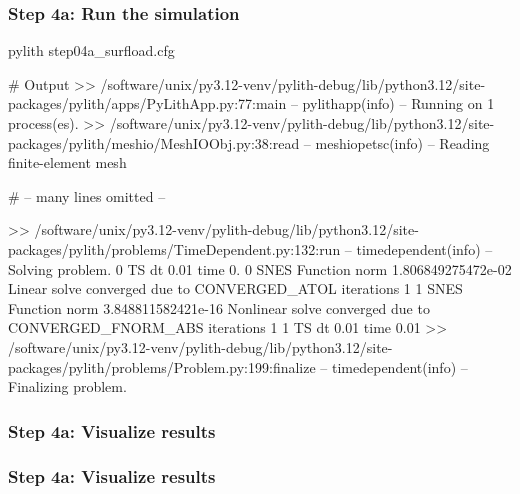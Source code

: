 \documentclass[aspectratio=169]{beamer}
\begin{document}
\begin{frame}[fragile]
  \frametitle{Step 4a: Run the simulation}
  \summary{}

\begin{bashcode}
pylith step04a_surfload.cfg

# Output
 >> /software/unix/py3.12-venv/pylith-debug/lib/python3.12/site-packages/pylith/apps/PyLithApp.py:77:main
 -- pylithapp(info)
 -- Running on 1 process(es).
 >> /software/unix/py3.12-venv/pylith-debug/lib/python3.12/site-packages/pylith/meshio/MeshIOObj.py:38:read
 -- meshiopetsc(info)
 -- Reading finite-element mesh

# -- many lines omitted --

 >> /software/unix/py3.12-venv/pylith-debug/lib/python3.12/site-packages/pylith/problems/TimeDependent.py:132:run
 -- timedependent(info)
 -- Solving problem.
0 TS dt 0.01 time 0.
    0 SNES Function norm 1.806849275472e-02
      Linear solve converged due to CONVERGED_ATOL iterations 1
    1 SNES Function norm 3.848811582421e-16
    Nonlinear solve converged due to CONVERGED_FNORM_ABS iterations 1
1 TS dt 0.01 time 0.01
 >> /software/unix/py3.12-venv/pylith-debug/lib/python3.12/site-packages/pylith/problems/Problem.py:199:finalize
 -- timedependent(info)
 -- Finalizing problem.
\end{bashcode}
  
\end{frame}


\begin{frame}
  \frametitle{Step 4a: Visualize results}

    
\end{frame}


\begin{frame}
  \frametitle{Step 4a: Visualize results}

    
\end{frame}
\end{document}
